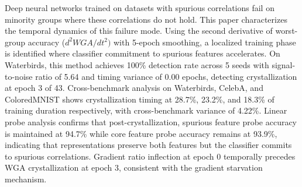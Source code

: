 
Deep neural networks trained on datasets with spurious correlations fail on minority groups where these correlations do not hold. This paper characterizes the temporal dynamics of this failure mode. Using the second derivative of worst-group accuracy ($d^2WGA/dt^{2})$ with 5-epoch smoothing, a localized training phase is identified where classifier commitment to spurious features accelerates. On Waterbirds, this method achieves 100\% detection rate across 5 seeds with signal-to-noise ratio of 5.64 and timing variance of 0.00 epochs, detecting crystallization at epoch 3 of 43. Cross-benchmark analysis on Waterbirds, CelebA, and ColoredMNIST shows crystallization timing at 28.7\%, 23.2\%, and 18.3\% of training duration respectively, with cross-benchmark variance of 4.22\%. Linear probe analysis confirms that post-crystallization, spurious feature probe accuracy is maintained at 94.7\% while core feature probe accuracy remains at 93.9\%, indicating that representations preserve both features but the classifier commits to spurious correlations. Gradient ratio inflection at epoch 0 temporally precedes WGA crystallization at epoch 3, consistent with the gradient starvation mechanism.

